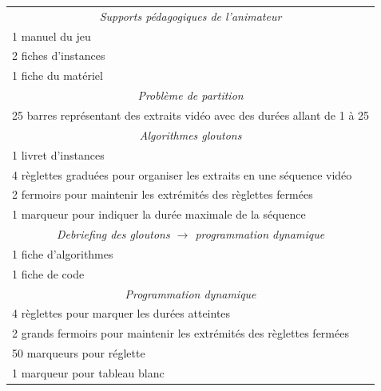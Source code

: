 \begin{tabular}{p{\textwidth}}
  \toprule
  \multicolumn{1}{c}{\emph{Supports pédagogiques de l'animateur}} \\
  1 manuel du jeu  \\
  2 fiches d'instances \\
  1 fiche du matériel \\
  \midrule
  \multicolumn{1}{c}{\emph{Problème de partition}} \\
  25 barres représentant des extraits vidéo avec des durées allant de 1 à 25 \\
  \midrule
  \multicolumn{1}{c}{\emph{Algorithmes gloutons}} \\
  1 livret d'instances \\
  4 règlettes graduées pour organiser les extraits en une séquence vidéo \\
  2 fermoirs pour maintenir les extrémités des règlettes fermées \\
  1 marqueur pour indiquer la durée maximale de la séquence \\
  \midrule
  \multicolumn{1}{c}{\emph{Debriefing des gloutons $\rightarrow$ programmation dynamique}} \\
  1 fiche d'algorithmes\\
  1 fiche de code\\
  \midrule
  \multicolumn{1}{c}{\emph{Programmation dynamique}} \\
  4 règlettes pour marquer les durées atteintes \\
  2 grands fermoirs pour maintenir les extrémités des règlettes fermées \\
  50 marqueurs pour réglette  \\
  1 marqueur pour tableau blanc  \\
  \bottomrule
\end{tabular}
